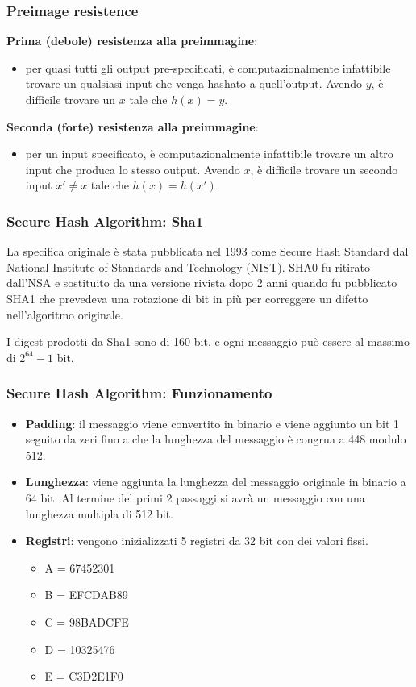 \begin{frame}
\frametitle{Preimage resistence}
\textbf{Prima (debole) resistenza alla preimmagine}:
\begin{itemize}
    \item per quasi tutti gli output pre-specificati, è computazionalmente infattibile trovare un qualsiasi input che venga hashato a quell'output.
    Avendo \( y \), è difficile trovare un \( x \) tale che \( h(x) = y \).
\end{itemize}
\textbf{Seconda (forte) resistenza alla preimmagine}:
\begin{itemize}
    \item per un input specificato, è computazionalmente infattibile trovare un altro input che produca lo stesso output.
     Avendo \( x \), è difficile trovare un secondo input \( x' \neq x \) tale che \( h(x) = h(x') \).
\end{itemize}

\end{frame}

\begin{frame}
\frametitle{Secure Hash Algorithm: Sha1}

La specifica originale è stata pubblicata nel 1993 come Secure Hash Standard dal National Institute of Standards and Technology (NIST).
SHA0 fu ritirato dall'NSA e sostituito da una versione rivista dopo 2 anni quando fu pubblicato SHA1 che prevedeva una rotazione di bit in più
per correggere un difetto nell'algoritmo originale.

\vspace{1cm}

I digest prodotti da Sha1 sono di 160 bit, e ogni messaggio può essere al massimo di \(2^{64} - 1\) bit.
\end{frame}

\begin{frame}
\frametitle{Secure Hash Algorithm: Funzionamento}
\begin{itemize}
    \item \textbf{Padding}: il messaggio viene convertito in binario e viene aggiunto un bit 1 seguito da zeri fino a che la lunghezza del messaggio è congrua a 448 modulo 512.
    \item \textbf{Lunghezza}: viene aggiunta la lunghezza del messaggio originale in binario a 64 bit.
    Al termine del primi 2 passaggi si avrà un messaggio con una lunghezza multipla di 512 bit.
    \item \textbf{Registri}: vengono inizializzati 5 registri da 32 bit con dei valori fissi.
    \begin{itemize}
        \item A = 67452301
        \item B = EFCDAB89
        \item C = 98BADCFE
        \item D = 10325476
        \item E = C3D2E1F0
    \end{itemize}
\end{itemize}
\end{frame}

